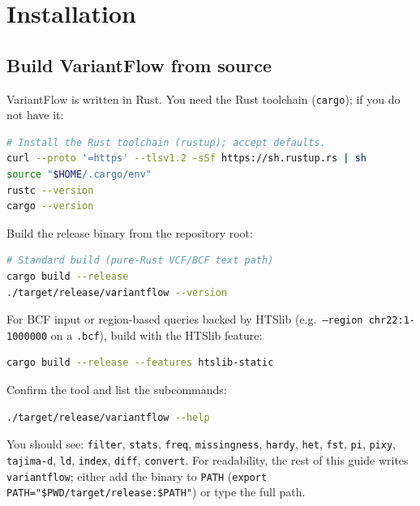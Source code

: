 \documentclass[11pt]{article}
\begin{document}
\section{Installation}

\subsection{Build VariantFlow from source}
\textsf{VariantFlow} is written in Rust. You need the Rust toolchain
(\texttt{cargo}); if you do not have it:
\begin{lstlisting}[language=bash]
# Install the Rust toolchain (rustup); accept defaults.
curl --proto '=https' --tlsv1.2 -sSf https://sh.rustup.rs | sh
source "$HOME/.cargo/env"
rustc --version
cargo --version
\end{lstlisting}

Build the release binary from the repository root:
\begin{lstlisting}[language=bash]
# Standard build (pure-Rust VCF/BCF text path)
cargo build --release
./target/release/variantflow --version
\end{lstlisting}

For BCF input or region-based queries backed by HTSlib (e.g.\
\texttt{--region chr22:1-1000000} on a \texttt{.bcf}), build with the HTSlib
feature:
\begin{lstlisting}[language=bash]
cargo build --release --features htslib-static
\end{lstlisting}

Confirm the tool and list the subcommands:
\begin{lstlisting}[language=bash]
./target/release/variantflow --help
\end{lstlisting}
You should see: \texttt{filter}, \texttt{stats}, \texttt{freq},
\texttt{missingness}, \texttt{hardy}, \texttt{het}, \texttt{fst}, \texttt{pi},
\texttt{pixy}, \texttt{tajima-d}, \texttt{ld}, \texttt{index}, \texttt{diff},
\texttt{convert}. For readability, the rest of this guide writes
\texttt{variantflow}; either add the binary to \texttt{PATH}
(\texttt{export PATH="\$PWD/target/release:\$PATH"}) or type the full path.
\end{document}
